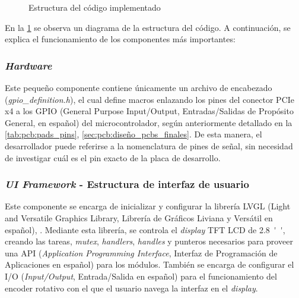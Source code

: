\begin{figure}[H]
{
        }
    \caption{Estructura del código implementado}
    \label{fig:soft:diagrama-arquitectura}
\end{figure}

En la \cref{fig:soft:diagrama-arquitectura} se observa un diagrama de la estructura del código. A continuación, se explica el funcionamiento de los componentes más importantes:

\subsubsection{\textit{Hardware}}

Este pequeño componente contiene únicamente un archivo de encabezado (\textit{gpio\_definition.h}), el cual define macros enlazando los pines del conector PCIe x4 a los GPIO (General Purpose Input/Output, Entradas/Salidas de Propósito General, en español) del microcontrolador, según anteriormente detallado en la \cref{tab:pcb:pads_pins}, \cref{sec:pcb:diseño_pcbs_finales}. De esta manera, el desarrollador puede referirse a la nomenclatura de pines de señal, sin necesidad de investigar cuál es el pin exacto de la placa de desarrollo.

\subsubsection{\textit{UI Framework} - Estructura de interfaz de usuario}

Este componente se encarga de inicializar y configurar la librería LVGL (Light and Versatile Graphics Library, Librería de Gráficos Liviana y Versátil en español), \parencite{LVGL}. Mediante esta librería, se controla el \textit{display} TFT LCD de \SI{2.8}{''}, creando las tareas, \textit{mutex}, \textit{handlers}, \textit{handles} y punteros necesarios para proveer una API (\textit{Application Programming Interface}, Interfaz de Programación de Aplicaciones en español) para los módulos. También se encarga de configurar el I/O (\textit{Input/Output}, Entrada/Salida en español) para el funcionamiento del encoder rotativo con el que el usuario navega la interfaz en el \textit{display}.

